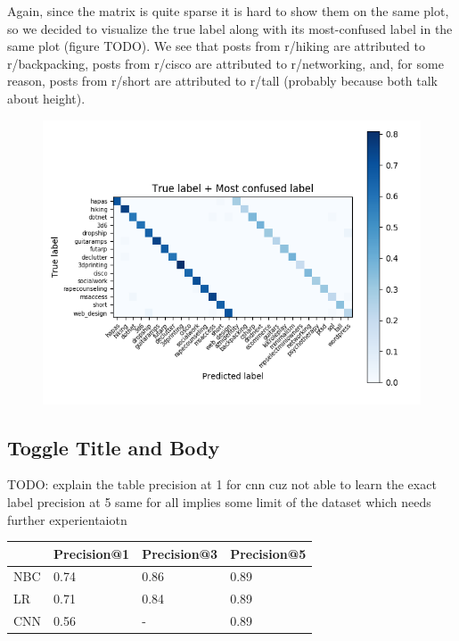 \documentclass{sig-alternate-05-2015}
\begin{document}
Again, since the matrix is quite sparse it is hard to show them on the same plot, so we decided to visualize the true label along with its most-confused label in the same plot (figure TODO). We see that posts from r/hiking are attributed to r/backpacking, posts from r/cisco are attributed to r/networking, and, for some reason, posts from r/short are attributed to r/tall (probably because both talk about height).

\begin{figure}[H]
\centering
\includegraphics[width=\linewidth]{../plots/confusion-matrix-true-label-vs-most-confused-label.png}
\caption{}
\end{figure}

\subsection{Toggle Title and Body}

TODO: explain the table
precision at 1 for cnn cuz not able to learn the exact label
precision at 5 same for all implies some limit of the dataset which needs further experientaiotn

\begin{table}[H]
\begin{tabular}{|l|l|l|l|}
\hline
    & Precision@1 & Precision@3 & Precision@5 \\ \hline
NBC & 0.74        & 0.86        & 0.89        \\ \hline
LR  & 0.71        & 0.84        & 0.89       \\ \hline
CNN & 0.56        & -           & 0.89        \\ \hline
\end{tabular}
\end{table}
\end{document}
